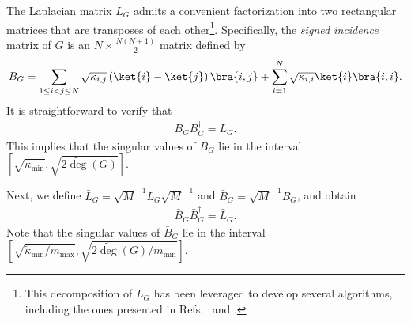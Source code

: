 \documentclass[superscriptaddress,onecolumn,nofootinbib,longbibliography,a4paper,accepted=2026-09-29]{quantumarticle}
\theoremstyle{plain}
\theoremstyle{definition}
\numberwithin{thm}{section}
\numberwithin{assumption}{section}
\numberwithin{lemma}{section}
\numberwithin{prop}{section}
\numberwithin{cor}{section}
\numberwithin{definition}{section}
\numberwithin{rmk}{section}
\numberwithin{equation}{section}
\newcommand{\lrb}[1]{\left ( #1 \right )}
\newcommand{\tdeg}[1]{\widetilde{\operatorname{deg}}\lrb{#1}}
\begin{document}
The Laplacian matrix $L_G$ admits a convenient factorization into two rectangular matrices that are transposes of each other\footnote{This decomposition of $L_G$ has been leveraged to develop several algorithms, including the ones presented in Refs.~\cite{wang2017efficient} and \cite{chakraborty2019thepower}.}. Specifically, the \emph{signed incidence} matrix of $G$ is an $N \times \frac{N(N+1)}{2}$ matrix defined by
\begin{align}
B_G = \sum_{1\le i<j\le N} \sqrt{\kappa_{i,j}} \left( \ket{i} - \ket{j} \right) \bra{i,j} + \sum_{i=1}^N \sqrt{\kappa_{i,i}}\ket{i}\bra{i,i}.
\label{eq:incidence_matrix_def}
\end{align}
It is straightforward to verify that 
\begin{align}
B_G B_G^\dagger = L_G.    
\end{align}
This implies that the singular values of $B_G$ lie in the interval $[\sqrt{\tilde{\kappa}_{\mathrm{min}}}, \sqrt{2\tdeg{G}}]$. 

Next, we define $\bar{L}_G=\sqrt{M}^{-1}L_G \sqrt{M}^{-1}$ and 
$\bar{B}_G=\sqrt{M}^{-1}B_G$, and obtain
\begin{align}
\bar{B}_G \bar{B}_G^{\dagger}=\bar{L}_G.  
\end{align}
Note that the singular values of $\bar{B}_G$ lie in the interval $[\sqrt{\tilde{\kappa}_{\mathrm{min}}/m_{\mathrm{max}}}, \sqrt{2\tdeg{G}/m_{\mathrm{min}}}]$.
\end{document}
